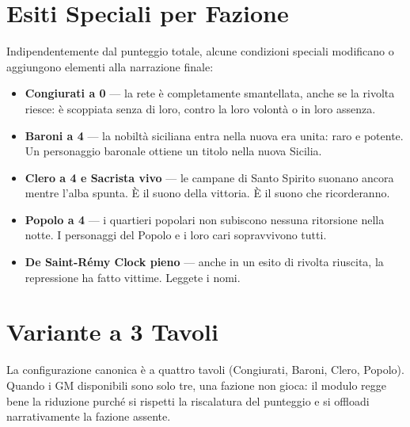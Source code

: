 
\secsep

\section{Esiti Speciali per Fazione}

Indipendentemente dal punteggio totale, alcune condizioni speciali
modificano o aggiungono elementi alla narrazione finale:

\begin{itemize}
  \item \textbf{Congiurati a 0} — la rete è completamente smantellata,
    anche se la rivolta riesce: è scoppiata senza di loro, contro
    la loro volontà o in loro assenza.
  \item \textbf{Baroni a 4} — la nobiltà siciliana entra nella
    nuova era unita: raro e potente. Un personaggio baronale
    ottiene un titolo nella nuova Sicilia.
  \item \textbf{Clero a 4 e Sacrista vivo} — le campane di Santo
    Spirito suonano ancora mentre l'alba spunta. È il suono della
    vittoria. È il suono che ricorderanno.
  \item \textbf{Popolo a 4} — i quartieri popolari non subiscono
    nessuna ritorsione nella notte. I personaggi del Popolo e
    i loro cari sopravvivono tutti.
  \item \textbf{De Saint-Rémy Clock pieno} — anche in un esito
    di rivolta riuscita, la repressione ha fatto vittime. Leggete
    i nomi.
\end{itemize}

\secsep

\section{Variante a 3 Tavoli}

La configurazione canonica è a quattro tavoli (Congiurati, Baroni,
Clero, Popolo). Quando i GM disponibili sono solo tre, una fazione
non gioca: il modulo regge bene la riduzione purché si rispetti la
riscalatura del punteggio e si offloadi narrativamente la fazione
assente.

